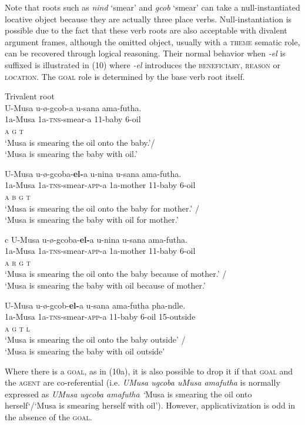 \documentclass[output=paper]{langsci/langscibook}
\begin{document}
Note that roots such as \textit{nind} ‘smear’ and \textit{gcob} ‘smear’ can take a null-instantiated locative object because they are actually three place verbs. Null-instantiation is possible due to the fact that these verb roots are also acceptable with divalent argument frames, although the omitted object, usually with a \textsc{theme }sematic role, can be recovered through logical reasoning. Their normal behavior when \textit{-el} is suffixed is illustrated in (10) where \textit{-el} introduces the \textsc{beneficiary}, \textsc{reason} or \textsc{location}. The \textsc{goal} role is determined by the base verb root itself.

\ea
{Trivalent root}\\
\ea
\gll U-Musa u-ø-gcob-a u-sana ama-futha. \\
 1a-Musa 1a-\textsc{tns}-smear-a 11-baby 6-oil\\
 \textsc{a g t}\\
\glt ‘Musa is smearing the oil onto the baby.’/\\
 ‘Musa is smearing the baby with oil.’

\ex
\gll U-Musa u-ø-gcoba-\textbf{el-}a u-nina u-sana ama-futha. \\
 1a-Musa 1a-\textsc{tns}-smear-\textsc{app}-a 1a-mother 11-baby 6-oil\\
 \textsc{a b g t}\\
\glt ‘Musa is smearing the oil onto the baby for mother.’ /\\
‘Musa is smearing the baby with oil for mother.’

\ex
\gll c U-Musa u-ø-gcoba-\textbf{el-}a u-nina u-sana ama-futha. \\
 1a-Musa 1a-\textsc{tns}-smear-\textsc{app}-a 1a-mother 11-baby 6-oil\\
 \textsc{a r g t}\\
\glt ‘Musa is smearing the oil onto the baby because of mother.’ /\\
 ‘Musa is smearing the baby with oil because of mother.’

\ex
\gll U-Musa u-ø-gcob-\textbf{el-}a u-sana ama-futha pha-ndle. \\
 1a-Musa 1a-\textsc{tns}-smear-\textsc{app}-a 11-baby 6-oil 15-outside\\
 \textsc{a g t l}\\
\glt ‘Musa is smearing the oil onto the baby outside’ / \\
‘Musa is smearing the baby with oil outside’ 
\z
\z

Where there is a \textsc{goal,} as in (10a), it is also possible to drop it if that \textsc{goal} and the \textsc{agent} are co-referential (i.e. \textit{UMusa ugcoba uMusa amafutha} is normally expressed as \textit{UMusa ugcoba amafutha ‘}Musa is smearing the oil onto herself‘/‘Musa is smearing herself with oil’). However, applicativization is odd in the absence of the \textsc{goal.}
\end{document}
